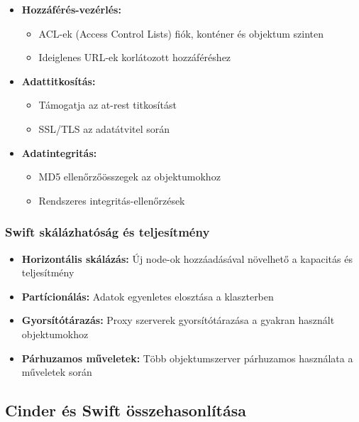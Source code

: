 \documentclass[a4paper,12pt]{article}
\begin{document}
    \begin{itemize}
        \item \textbf{Hozzáférés-vezérlés:}
        \begin{itemize}
            \item ACL-ek (Access Control Lists) fiók, konténer és objektum szinten
            \item Ideiglenes URL-ek korlátozott hozzáféréshez
        \end{itemize}

        \item \textbf{Adattitkosítás:}
        \begin{itemize}
            \item Támogatja az at-rest titkosítást
            \item SSL/TLS az adatátvitel során
        \end{itemize}

        \item \textbf{Adatintegritás:}
        \begin{itemize}
            \item MD5 ellenőrzőösszegek az objektumokhoz
            \item Rendszeres integritás-ellenőrzések
        \end{itemize}
    \end{itemize}

    \subsubsection{Swift skálázhatóság és teljesítmény}

    \begin{itemize}
        \item \textbf{Horizontális skálázás:} Új node-ok hozzáadásával növelhető a kapacitás és teljesítmény
        \item \textbf{Partícionálás:} Adatok egyenletes elosztása a klaszterben
        \item \textbf{Gyorsítótárazás:} Proxy szerverek gyorsítótárazása a gyakran használt objektumokhoz
        \item \textbf{Párhuzamos műveletek:} Több objektumszerver párhuzamos használata a műveletek során
    \end{itemize}

    \subsection{Cinder és Swift összehasonlítása}
\end{document}

